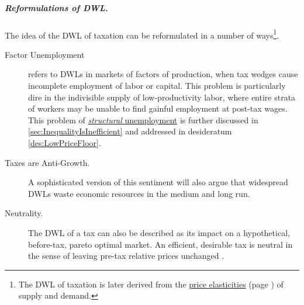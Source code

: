 \subparagraph{Reformulations of DWL.} The idea of the DWL of taxation can be reformulated in a number of ways\footnote{The DWL of taxation is later derived from the \hyperref[sec:TaxInelastic]{price elasticities} (page \pageref{sec:TaxInelastic}) of supply and demand.}.
\begin{description}
	\item[Factor Unemployment] refers to DWLs in markets of factors of production, when tax wedges cause incomplete employment of labor or capital.
This problem is particularly dire in the indivisible supply of low-productivity labor, where entire strata of workers may be unable to find gainful employment at post-tax wages.
This problem of \hyperref[sec:StructuralUnemployment]{\emph{structural} unemployment} is further discussed in \autoref{sec:InequalityIsInefficient} and addressed in desideratum \ref{des:LowPriceFloor}.
	\item[Taxes are Anti-Growth.] A sophisticated version of this sentiment will also argue that widespread DWLs waste economic resources in the medium and long run.
	\item[Neutrality.] The DWL of a tax can also be described as its impact on a hypothetical, before-tax, pareto optimal market.
An efficient, desirable tax is neutral in the sense of leaving pre-tax relative prices unchanged \citep[849]{McCaffery2005}.
\end{description}




